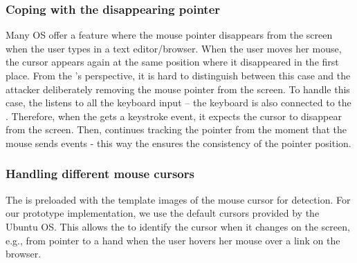 

\subsubsection{\bfseries Coping with the disappearing pointer} Many OS offer a feature where the mouse pointer disappears from the screen when the user types in a text editor/browser. When the user moves her mouse, the cursor appears again at the same position where it disappeared in the first place. From the \device's perspective, it is hard to distinguish between this case and the attacker deliberately removing the mouse pointer from the screen. To handle this case, the \device listens to all the keyboard input -- the keyboard is also connected to the \device. Therefore, when the \device gets a keystroke event, it expects the cursor to disappear from the screen. Then, \device continues tracking the pointer from the moment that the mouse sends events  - this way the \device ensures the consistency of the pointer position.  


\subsubsection{\bfseries Handling different mouse cursors} The \device is preloaded with the template images of the mouse cursor for detection. For our \name prototype implementation, we use the default cursors provided by the Ubuntu OS. This allows the \device to identify the cursor when it changes on the screen, e.g., from pointer to a hand when the user hovers her mouse over a link on the browser. 

